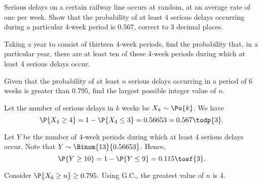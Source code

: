 \begin{problem}
    Serious delays on a certain railway line occurs at random, at an average rate of one per week. Show that the probability of at least 4 serious delays occurring during a particular 4-week period is $0.567$, correct to 3 decimal places.

    Taking a year to consist of thirteen 4-week periods, find the probability that, in a particular year, there are at least ten of these 4-week periods during which at least 4 serious delays occur.

    Given that the probability of at least $n$ serious delays occurring in a period of 6 weeks is greater than $0.795$, find the largest possible integer value of $n$.
\end{problem}
\begin{solution}
    Let the number of serious delays in $k$ weeks be $X_k \sim \Po{k}$. We have \[\P{X_4 \geq 4} = 1 - \P{X_4 \leq 3} = 0.56653 = 0.567 \todp{3}.\]
    
    Let $Y$ be the number of 4-week periods during which at least 4 serious delays occur. Note that $Y \sim \Binom{13}{0.56653}$. Hence, \[\P{Y \geq 10} = 1 - \P{Y \leq 9} = 0.115 \tosf{3}.\]
    
    Consider $\P{X_6 \geq n} \geq 0.795$. Using G.C., the greatest value of $n$ is 4.
\end{solution}

